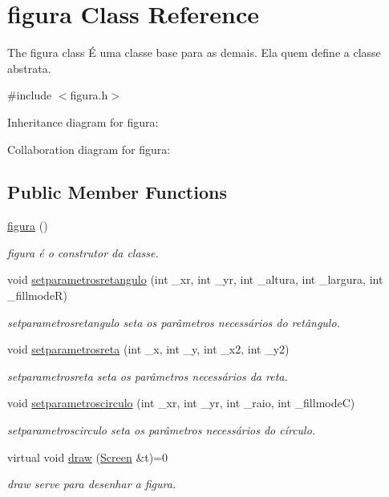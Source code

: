 \hypertarget{classfigura}{}\section{figura Class Reference}
\label{classfigura}


The figura class É uma classe base para as demais. Ela quem define a classe abstrata.  




{\ttfamily \#include $<$figura.\+h$>$}



Inheritance diagram for figura\+:


Collaboration diagram for figura\+:
\subsection*{Public Member Functions}
\begin{DoxyCompactItemize}
\item 
\hyperlink{classfigura_a792b267327a4fe9da4932417a1f12a1f}{figura} ()\hypertarget{classfigura_a792b267327a4fe9da4932417a1f12a1f}{}\label{classfigura_a792b267327a4fe9da4932417a1f12a1f}

\begin{DoxyCompactList}\small\item\em figura é o construtor da classe. \end{DoxyCompactList}\item 
void \hyperlink{classfigura_a2a46e5a0a3e26b17da3c16067fb42ba0}{setparametrosretangulo} (int \+\_\+xr, int \+\_\+yr, int \+\_\+altura, int \+\_\+largura, int \+\_\+fillmodeR)
\begin{DoxyCompactList}\small\item\em setparametrosretangulo seta os parâmetros necessários do retângulo. \end{DoxyCompactList}\item 
void \hyperlink{classfigura_a9b64c9372d040df37dc71c61f148fd57}{setparametrosreta} (int \+\_\+x, int \+\_\+y, int \+\_\+x2, int \+\_\+y2)
\begin{DoxyCompactList}\small\item\em setparametrosreta seta os parâmetros necessários da reta. \end{DoxyCompactList}\item 
void \hyperlink{classfigura_a1f5fa6ec7092552181e83725e43d7e23}{setparametroscirculo} (int \+\_\+xr, int \+\_\+yr, int \+\_\+raio, int \+\_\+fillmodeC)
\begin{DoxyCompactList}\small\item\em setparametroscirculo seta os parâmetros necessários do círculo. \end{DoxyCompactList}\item 
virtual void \hyperlink{classfigura_a0afddf09965208311924d68e7a434f1d}{draw} (\hyperlink{classScreen}{Screen} \&t)=0
\begin{DoxyCompactList}\small\item\em draw serve para desenhar a figura. \end{DoxyCompactList}\end{DoxyCompactItemize}
